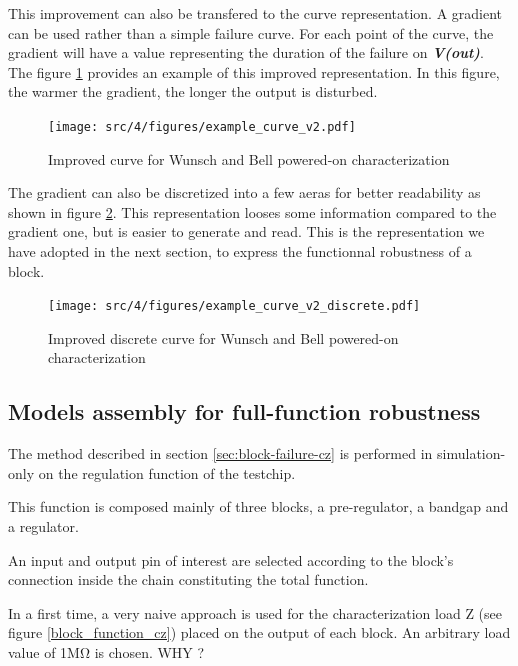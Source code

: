 This improvement can also be transfered to the curve representation.
A gradient can be used rather than a simple failure curve.
For each point of the curve, the gradient will have a value representing the duration of the failure on \textbf{\textit{V(out)}}.
The figure \ref{wb_cz_curve_example_v2} provides an example of this improved representation.
In this figure, the warmer the gradient, the longer the output is disturbed.

\begin{figure}[!htbp]
  \centering
  \texttt{[image: src/4/figures/example\_curve\_v2.pdf]}
  \caption{Improved curve for Wunsch and Bell powered-on characterization}
  \label{wb_cz_curve_example_v2}
\end{figure}

The gradient can also be discretized into a few aeras for better readability as shown in figure \ref{wb_cz_curve_example_v2_discrete}.
This representation looses some information compared to the gradient one, but is easier to generate and read.
This is the representation we have adopted in the next section, to express the functionnal robustness of a block.

\begin{figure}[!htbp]
  \centering
  \texttt{[image: src/4/figures/example\_curve\_v2\_discrete.pdf]}
  \caption{Improved discrete curve for Wunsch and Bell powered-on characterization}
  \label{wb_cz_curve_example_v2_discrete}
\end{figure}

\subsection{Models assembly for full-function robustness}

The method described in section \ref{sec:block-failure-cz} is performed in simulation-only on the regulation function of the testchip.

This function is composed mainly of three blocks, a pre-regulator, a bandgap and a regulator.

An input and output pin of interest are selected according to the block's connection inside the chain constituting the total function.

In a first time, a very naive approach is used for the characterization load Z (see figure \ref{block_function_cz}) placed on the output of each block.
An arbitrary load value of 1MΩ is chosen. WHY ?

